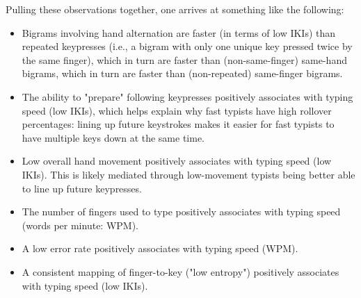 \documentclass[11pt]{article}
\begin{document}
Pulling these observations together, one arrives at something like the following:

\begin{itemize}
\item Bigrams involving hand alternation are faster (in terms of low IKIs) than repeated keypresses (i.e., a bigram with only one unique key pressed twice by the same finger), which in turn are faster than (non-same-finger) same-hand bigrams, which in turn are faster than (non-repeated) same-finger bigrams.
\item The ability to "prepare" following keypresses positively associates with typing speed (low IKIs), which helps explain why fast typists have high rollover percentages: lining up future keystrokes makes it easier for fast typists to have multiple keys down at the same time.
\item Low overall hand movement positively associates with typing speed (low IKIs). This is likely mediated through low-movement typists being better able to line up future keypresses.
\item The number of fingers used to type positively associates with typing speed (words per minute: WPM).
\item A low error rate positively associates with typing speed (WPM).
\item A consistent mapping of finger-to-key ("low entropy") positively associates with typing speed (low IKIs).
\end{itemize}
\end{document}
